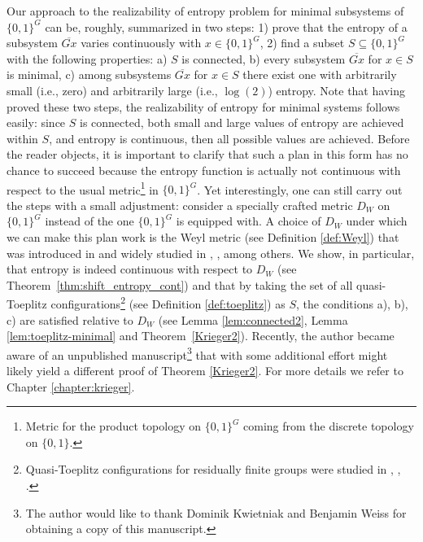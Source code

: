 Our approach to the realizability of entropy problem for minimal subsystems of $\{0,1\}^G$ can be, roughly, summarized in two steps: 1) prove that the entropy of a subsystem $\overline{Gx}$ varies continuously with $x\in \{0,1\}^G$, 2) find a subset $S\subseteq \{0,1\}^G$ with the following properties: a) $S$ is connected, b) every subsystem $\overline{Gx}$ for $x\in S$ is minimal, c) among subsystems $\overline{Gx}$ for $x\in S$ there exist one with arbitrarily small (i.e., zero) and arbitrarily large (i.e., $\log(2)$) entropy. 
%
Note that having proved these two steps, the realizability of entropy for minimal systems follows easily: since $S$ is connected, both small and large values of entropy are achieved within $S$, and entropy is continuous, then all possible values are achieved.
%
Before the reader objects, it is important to clarify that such a plan in this form has no chance to succeed because the entropy function is actually not continuous with respect to the usual metric\footnote{Metric for the product topology on $\{0,1\}^G$ coming from the discrete topology on $\{0,1\}$.} in $\{0,1\}^G$.
%
Yet interestingly, one can still carry out the steps with a small adjustment: consider a specially crafted metric $D_W$ on $\{0,1\}^G$ instead of the one $\{0,1\}^G$ is equipped with.
%
A choice of $D_W$ under which we can make this plan work is the Weyl metric  (see Definition \ref{def:Weyl}) that was introduced in \cite{JK69} and widely studied  in \cite{DI88}, \cite{BFK97}, \cite{ST12} among others.
%
We show, in particular, that entropy is indeed continuous with respect to $D_W$ (see Theorem~\ref{thm:shift_entropy_cont}) and that by taking the set of all quasi-Toeplitz configurations\footnote{Quasi-Toeplitz configurations for residually finite groups were studied in \cite{CP14}, \cite{CP08}, \cite{Krieger10}.} (see Definition \ref{def:toeplitz}) as $S$, the conditions a), b), c) are satisfied relative to $D_W$ (see Lemma \ref{lem:connected2}, Lemma \ref{lem:toeplitz-minimal} and Theorem~\ref{Krieger2}).
%
Recently, the author became aware of an unpublished manuscript\footnote{The author would like to thank Dominik Kwietniak and Benjamin Weiss for obtaining a copy of this manuscript.} \cite{Rosenthal} that with some additional effort might likely yield a different proof of Theorem \ref{Krieger2}. For more details we refer to Chapter \ref{chapter:krieger}.

